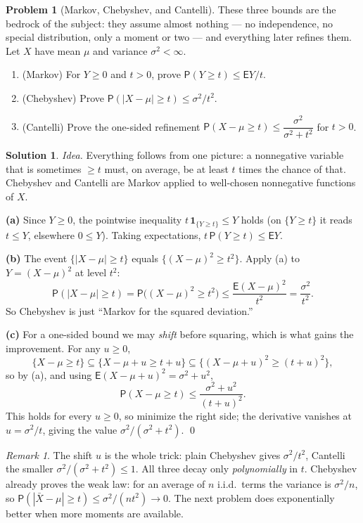 \documentclass[14pt]{extarticle}
\theoremstyle{definition}
\newtheorem{exercise}{Problem}
\newtheorem*{solution}{Solution}
\theoremstyle{remark}
\newtheorem*{remark}{Remark}
\newcommand\expc{\mathsf{E}}
\newcommand\prb{\mathsf{P}}
\begin{document}
\begin{exercise}[Markov, Chebyshev, and Cantelli]\label{prob:markov}
These three bounds are the bedrock of the subject: they assume almost nothing --- no independence, no special distribution, only a moment or two --- and everything later refines them. Let $X$ have mean $\mu$ and variance $\sigma^2<\infty$.
\begin{enumerate}[label=(\alph*)]
\item (Markov) For $Y\ge0$ and $t>0$, prove $\prb(Y\ge t)\le\expc Y/t$.
\item (Chebyshev) Prove $\prb(|X-\mu|\ge t)\le\sigma^2/t^2$.
\item (Cantelli) Prove the one-sided refinement $\prb(X-\mu\ge t)\le\dfrac{\sigma^2}{\sigma^2+t^2}$ for $t>0$.
\end{enumerate}
\end{exercise}
\begin{solution}
\emph{Idea.} Everything follows from one picture: a nonnegative variable that is sometimes $\ge t$ must, on average, be at least $t$ times the chance of that. Chebyshev and Cantelli are Markov applied to well-chosen nonnegative functions of $X$.

\textbf{(a)} Since $Y\ge0$, the pointwise inequality $t\,\mathbf 1_{\{Y\ge t\}}\le Y$ holds (on $\{Y\ge t\}$ it reads $t\le Y$, elsewhere $0\le Y$). Taking expectations, $t\,\prb(Y\ge t)\le\expc Y$.

\textbf{(b)} The event $\{|X-\mu|\ge t\}$ equals $\{(X-\mu)^2\ge t^2\}$. Apply (a) to $Y=(X-\mu)^2$ at level $t^2$:
\[
\prb(|X-\mu|\ge t)=\prb\bigl((X-\mu)^2\ge t^2\bigr)\le\frac{\expc(X-\mu)^2}{t^2}=\frac{\sigma^2}{t^2}.
\]
So Chebyshev is just ``Markov for the squared deviation.''

\textbf{(c)} For a one-sided bound we may \emph{shift} before squaring, which is what gains the improvement. For any $u\ge0$,
\[
\{X-\mu\ge t\}\subseteq\{X-\mu+u\ge t+u\}\subseteq\{(X-\mu+u)^2\ge(t+u)^2\},
\]
so by (a), and using $\expc(X-\mu+u)^2=\sigma^2+u^2$,
\[
\prb(X-\mu\ge t)\le\frac{\sigma^2+u^2}{(t+u)^2}.
\]
This holds for every $u\ge0$, so minimize the right side; the derivative vanishes at $u=\sigma^2/t$, giving the value $\sigma^2/(\sigma^2+t^2)$. \qed
\end{solution}
\begin{remark}
The shift $u$ is the whole trick: plain Chebyshev gives $\sigma^2/t^2$, Cantelli the smaller $\sigma^2/(\sigma^2+t^2)\le1$. All three decay only \emph{polynomially} in $t$. Chebyshev already proves the weak law: for an average of $n$ i.i.d.\ terms the variance is $\sigma^2/n$, so $\prb(|\bar X-\mu|\ge t)\le\sigma^2/(nt^2)\to0$. The next problem does exponentially better when more moments are available.
\end{remark}
\end{document}
